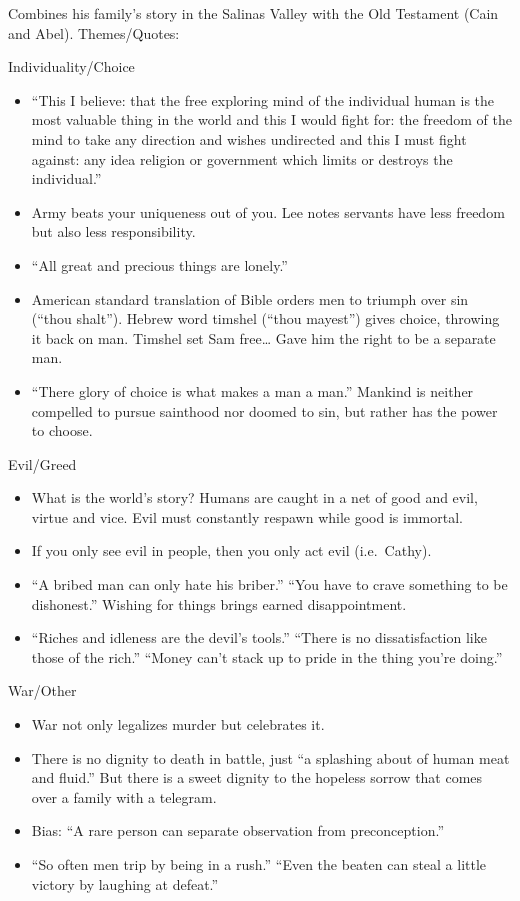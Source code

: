 \documentclass[
]{article}
\begin{document}
Combines his family's story in the Salinas Valley with the Old Testament
(Cain and Abel). Themes/Quotes:

Individuality/Choice

\begin{itemize}
\item
  ``This I believe: that the free exploring mind of the individual human
  is the most valuable thing in the world and this I would fight for:
  the freedom of the mind to take any direction and wishes undirected
  and this I must fight against: any idea religion or government which
  limits or destroys the individual.''
\item
  Army beats your uniqueness out of you. Lee notes servants have less
  freedom but also less responsibility.
\item
  ``All great and precious things are lonely.''
\item
  American standard translation of Bible orders men to triumph over sin
  (``thou shalt''). Hebrew word timshel (``thou mayest'') gives choice,
  throwing it back on man. Timshel set Sam free\ldots{} Gave him the
  right to be a separate man.
\item
  ``There glory of choice is what makes a man a man.'' Mankind is
  neither compelled to pursue sainthood nor doomed to sin, but rather
  has the power to choose.
\end{itemize}

Evil/Greed

\begin{itemize}
\item
  What is the world's story? Humans are caught in a net of good and
  evil, virtue and vice. Evil must constantly respawn while good is
  immortal.
\item
  If you only see evil in people, then you only act evil (i.e.~Cathy).
\item
  ``A bribed man can only hate his briber.'' ``You have to crave
  something to be dishonest.'' Wishing for things brings earned
  disappointment.
\item
  ``Riches and idleness are the devil's tools.'' ``There is no
  dissatisfaction like those of the rich.'' ``Money can't stack up to
  pride in the thing you're doing.''
\end{itemize}

War/Other

\begin{itemize}
\item
  War not only legalizes murder but celebrates it.
\item
  There is no dignity to death in battle, just ``a splashing about of
  human meat and fluid.'' But there is a sweet dignity to the hopeless
  sorrow that comes over a family with a telegram.
\item
  Bias: ``A rare person can separate observation from preconception.''
\item
  ``So often men trip by being in a rush.'' ``Even the beaten can steal
  a little victory by laughing at defeat.''
\end{itemize}
\end{document}
